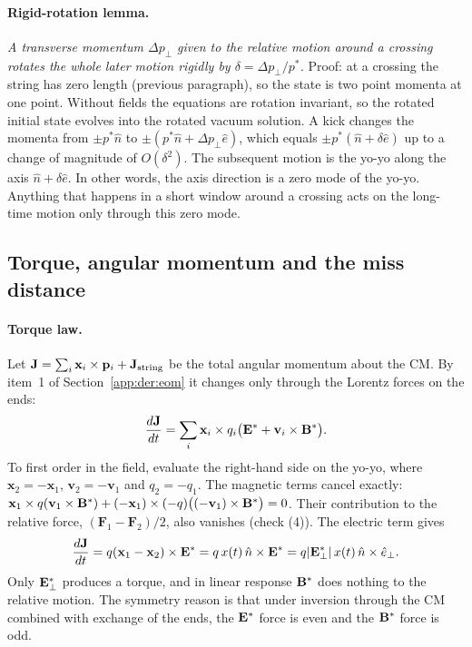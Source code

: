 \paragraph{Rigid-rotation lemma.} \emph{A transverse momentum $\Delta p_\perp$ given to the relative motion around a crossing
rotates the whole later motion rigidly by $\delta=\Delta p_\perp/p^*$.} Proof: at a crossing the string has zero length
(previous paragraph), so the state is two point momenta at one point. Without fields the equations are rotation
invariant, so the rotated initial state evolves into the rotated vacuum solution. A kick changes the momenta from
$\pm p^*\hat n$ to $\pm(p^*\hat n+\Delta p_\perp\hat e)$, which equals $\pm p^*(\hat n+\delta\hat e)$ up to a change of
magnitude of $O(\delta^2)$. The subsequent motion is the yo-yo along the axis $\hat n+\delta\hat e$. In other words, the
axis direction is a zero mode of the yo-yo. Anything that happens in a short window around a crossing acts on the
long-time motion only through this zero mode.

\subsection{Torque, angular momentum and the miss distance}\label{app:der:torque}
\paragraph{Torque law.} Let $\mathbf J=\sum_i\mathbf x_i\times\mathbf p_i+\mathbf J_{\rm string}$ be the total angular
momentum about the CM. By item~1 of Section~\ref{app:der:eom} it changes only through the Lorentz forces on the ends:
\begin{equation}
  \frac{d\mathbf J}{dt}=\sum_i\mathbf x_i\times q_i\bigl(\mathbf{E}^*+\mathbf v_i\times\mathbf{B}^*\bigr).
\end{equation}
To first order in the field, evaluate the right-hand side on the yo-yo, where $\mathbf x_2=-\mathbf x_1$,
$\mathbf v_2=-\mathbf v_1$ and $q_2=-q_1$. The magnetic terms cancel exactly:
$\mathbf x_1\times q(\mathbf v_1\times\mathbf{B}^*)+(-\mathbf x_1)\times(-q)\bigl((-\mathbf v_1)\times\mathbf{B}^*\bigr)=0$. Their
contribution to the relative force, $(\mathbf F_1-\mathbf F_2)/2$, also vanishes (check  (4)). The electric term
gives
\begin{equation}
  \frac{d\mathbf J}{dt}=q(\mathbf x_1-\mathbf x_2)\times\mathbf{E}^*=q\,x(t)\,\hat n\times\mathbf{E}^*
  =q|\mathbf{E}^*_\perp|\,x(t)\,\hat n\times\hat e_\perp .
  \label{eq:D:torque}
\end{equation}
Only $\mathbf{E}^*_\perp$ produces a torque, and in linear response $\mathbf{B}^*$ does nothing to the relative motion. The
symmetry reason is that under inversion through the CM combined with exchange of the ends, the $\mathbf{E}^*$ force is even
and the $\mathbf{B}^*$ force is odd.

